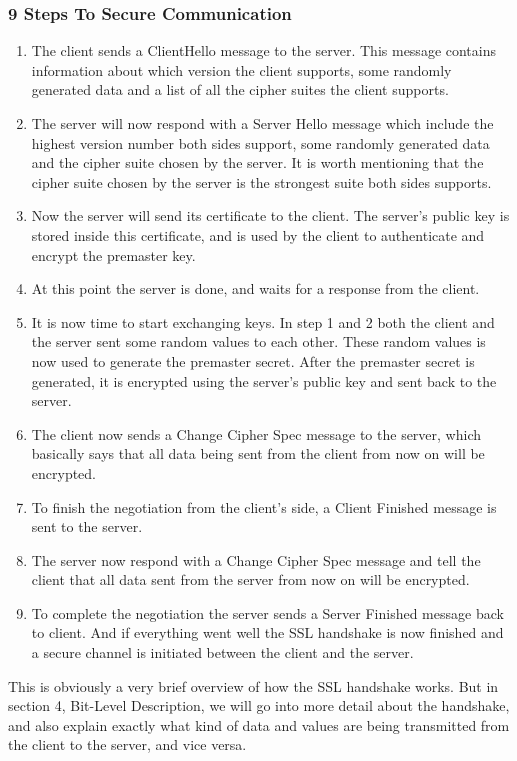 \subsubsection{9 Steps To Secure Communication}
\begin{enumerate}
\item The client sends a ClientHello message to the server. This message contains information about which version the client supports, some randomly generated data and a list of all the cipher suites the client supports.
\item The server will now respond with a Server Hello message which include the highest version number both sides support, some randomly generated data and the cipher suite chosen by the server. It is worth mentioning that the cipher suite chosen by the server is the strongest suite both sides supports.
\item Now the server will send its certificate to the client. The server's public key is stored inside this certificate, and is used by the client to authenticate and encrypt the premaster key.
\item At this point the server is done, and waits for a response from the client.
\item It is now time to start exchanging keys. In step 1 and 2 both the client and the server sent some random values to each other. These random values is now used to generate the premaster secret. After the premaster secret is generated, it is encrypted using the server's public key and sent back to the server.
\item The client now sends a Change Cipher Spec message to the server, which basically says that all data being sent from the client from now on will be encrypted.
\item To finish the negotiation from the client's side, a Client Finished message is sent to the server.
\item The server now respond with a Change Cipher Spec message and tell the client that all data sent from the server from now on will be encrypted.
\item To complete the negotiation the server sends a Server Finished message back to client. And if everything went well the SSL handshake is now finished and a secure channel is initiated between the client and the server.
\end{enumerate}
This is obviously a very brief overview of how the SSL handshake works. But in section 4, Bit-Level Description, we will go into more detail about the handshake, and also explain exactly what kind of data and values are being transmitted from the client to the server, and vice versa.